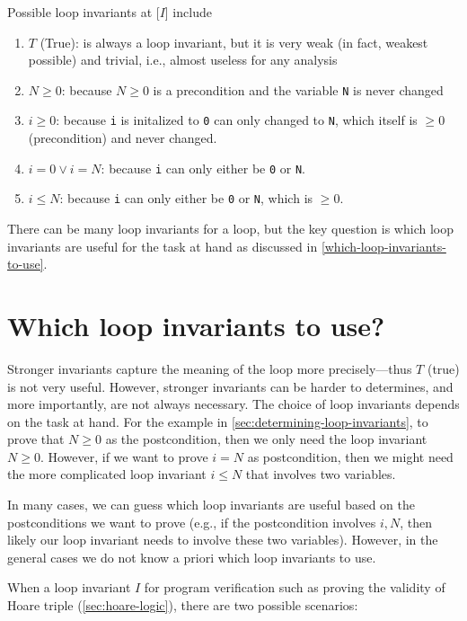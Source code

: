 \documentclass[oneside,11pt,dvipsnames]{book}
\begin{document}
Possible loop invariants at [$I$] include

\begin{enumerate}
\item
  $T$  (True): is always a loop invariant, but it is very weak (in fact, weakest possible) and trivial, i.e., almost useless for any analysis
\item $N \ge 0$: because $N \ge 0$ is a precondition and the variable \texttt{N} is never changed
\item $i \ge 0$: because \texttt{i} is initalized to
  \texttt{0} can only changed to \texttt{N}, which itself is
  $\ge 0$ (precondition) and never changed.
\item  $i = 0 \vee i = N$: because \texttt{i} can only either be \texttt{0} or \texttt{N}.
\item  $i \le N$: because \texttt{i} can only either be \texttt{0} or \texttt{N}, which is $\ge 0$.
\end{enumerate}

There can be many loop invariants for a loop, but the key question is which loop invariants are useful for the task at hand as discussed in \autoref{which-loop-invariants-to-use}.
\section{Which loop invariants to
use?}\label{which-loop-invariants-to-use}

Stronger invariants capture the meaning of the loop more precisely---thus $T$ (true) is not very useful.
However, stronger invariants can be harder to determines, and more importantly, are not always necessary. The choice of loop invariants depends on the task at hand. For the example in \autoref{sec:determining-loop-invariants},  to prove that $N \ge 0$ as the postcondition, then we only need the loop invariant $N \ge 0$. However, if we want to prove  $i=N$ as postcondition, then we might need the more complicated loop invariant $i\le N$ that involves two variables.

In many cases, we can guess which loop invariants are useful based on
the postconditions we want to prove (e.g., if the postcondition involves $i, N$, then likely our loop invariant needs to involve these two variables). However, in the general cases we do not know a priori which loop invariants to use. 

When a loop invariant $I$ for program verification such as proving the validity of Hoare triple (\autoref{sec:hoare-logic}), there are two possible scenarios: 
\end{document}
